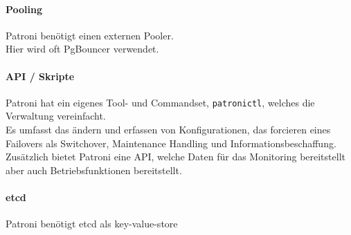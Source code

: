 \begin{flushleft}
    \paragraph{Pooling}
    Patroni benötigt einen externen Pooler.\\
    Hier wird oft PgBouncer \cite{ATBELZ2X} verwendet.
\end{flushleft}
\begin{flushleft}
    \paragraph{API / Skripte}
    Patroni hat ein eigenes Tool- und Commandset, \texttt{patronictl}, welches die Verwaltung vereinfacht.\\
    Es umfasst das ändern und erfassen von Konfigurationen, das forcieren eines Failovers als Switchover, Maintenance Handling und Informationsbeschaffung.\\

    Zusätzlich bietet Patroni eine API, welche Daten für das Monitoring bereitstellt aber auch Betriebsfunktionen bereitstellt.\\
\end{flushleft}
\begin{flushleft}
    \paragraph{\gls{etcd}}
    Patroni benötigt etcd als key-value-store
\end{flushleft}
